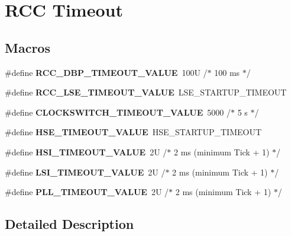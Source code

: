 \hypertarget{group___r_c_c___timeout}{}\section{R\+CC Timeout}
\label{group___r_c_c___timeout}
\subsection*{Macros}
\begin{DoxyCompactItemize}
\item 
\mbox{\label{group___r_c_c___timeout_gae578b5efd6bd38193ab426ce65cb77b1}} 
\#define {\bfseries R\+C\+C\+\_\+\+D\+B\+P\+\_\+\+T\+I\+M\+E\+O\+U\+T\+\_\+\+V\+A\+L\+UE}~100\+U    /$\ast$ 100 ms $\ast$/
\item 
\mbox{\label{group___r_c_c___timeout_gafe8ed1c0ca0e1c17ea69e09391498cc7}} 
\#define {\bfseries R\+C\+C\+\_\+\+L\+S\+E\+\_\+\+T\+I\+M\+E\+O\+U\+T\+\_\+\+V\+A\+L\+UE}~L\+S\+E\+\_\+\+S\+T\+A\+R\+T\+U\+P\+\_\+\+T\+I\+M\+E\+O\+UT
\item 
\mbox{\label{group___r_c_c___timeout_gab3caadc0f23d394d1033aba55d31fcdc}} 
\#define {\bfseries C\+L\+O\+C\+K\+S\+W\+I\+T\+C\+H\+\_\+\+T\+I\+M\+E\+O\+U\+T\+\_\+\+V\+A\+L\+UE}~5000    /$\ast$ 5 s    $\ast$/
\item 
\mbox{\label{group___r_c_c___timeout_gac0cd4ed24fa948844e1a40b12c450f32}} 
\#define {\bfseries H\+S\+E\+\_\+\+T\+I\+M\+E\+O\+U\+T\+\_\+\+V\+A\+L\+UE}~H\+S\+E\+\_\+\+S\+T\+A\+R\+T\+U\+P\+\_\+\+T\+I\+M\+E\+O\+UT
\item 
\mbox{\label{group___r_c_c___timeout_gad9e56670dcbbe9dbc3a8971b36bbec58}} 
\#define {\bfseries H\+S\+I\+\_\+\+T\+I\+M\+E\+O\+U\+T\+\_\+\+V\+A\+L\+UE}~2\+U      /$\ast$ 2 ms (minimum Tick + 1) $\ast$/
\item 
\mbox{\label{group___r_c_c___timeout_gad52c7f624c88b0c82ab41b9dbd2b347f}} 
\#define {\bfseries L\+S\+I\+\_\+\+T\+I\+M\+E\+O\+U\+T\+\_\+\+V\+A\+L\+UE}~2\+U      /$\ast$ 2 ms (minimum Tick + 1) $\ast$/
\item 
\mbox{\label{group___r_c_c___timeout_gad54d8ad9b3511329efee38b3ad0665de}} 
\#define {\bfseries P\+L\+L\+\_\+\+T\+I\+M\+E\+O\+U\+T\+\_\+\+V\+A\+L\+UE}~2\+U      /$\ast$ 2 ms (minimum Tick + 1) $\ast$/
\end{DoxyCompactItemize}


\subsection{Detailed Description}
